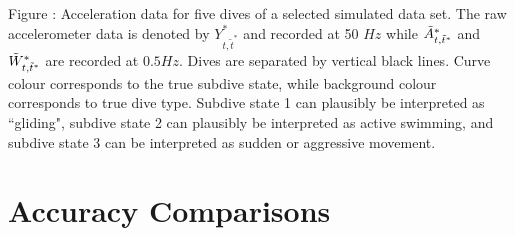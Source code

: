 \documentclass{article}
\begin{document}
    	\noindent Figure : Acceleration data for five dives of a selected simulated data set. The raw accelerometer data is denoted by $Y^*_{t,\tilde t^*}$ and recorded at 50 $Hz$ while $\tilde{A}^*_{t,\tilde t^*}$ and $\tilde{W}^*_{t,\tilde t^*}$ are recorded at $0.5 Hz$. Dives are separated by vertical black lines. Curve colour corresponds to the true subdive state, while background colour corresponds to true dive type. Subdive state 1 can plausibly be interpreted as ``gliding", subdive state 2 can plausibly be interpreted as active swimming, and subdive state 3 can be interpreted as sudden or aggressive movement.
    	\addtocounter{fignum}{1}

    \newpage
    \section{Accuracy Comparisons}
        
\end{document}
